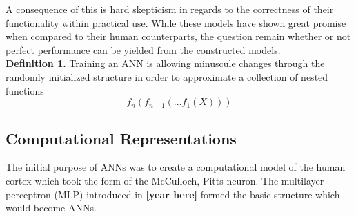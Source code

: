 A consequence of this is hard skepticism in regards to the correctness of their functionality within practical use. While these models have shown great promise when compared to their human counterparts, the question remain whether or not perfect performance can be yielded from the constructed models.\\

\textbf{Definition 1.} Training an ANN is allowing minuscule changes through the randomly initialized structure in order to approximate a collection of nested functions $$f_n(f_{n-1}(...f_1(X)))$$ 

\subsection{Computational Representations}
The initial purpose of ANNs was to create a computational model of the human cortex which took the form of the McCulloch, Pitts neuron. The multilayer perceptron (MLP) introduced in \textbf{[year here]} formed the basic structure which would become ANNs. 


